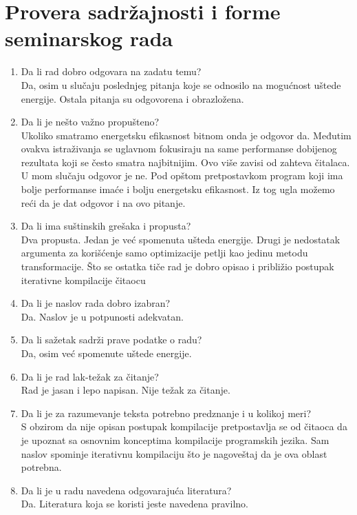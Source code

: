 \documentclass[a4paper]{report}
\begin{document}
\section{Provera sadržajnosti i forme seminarskog rada}

\begin{enumerate}
\item Da li rad dobro odgovara na zadatu temu?\\
Da, osim u slučaju poslednjeg pitanja koje se odnosilo na mogućnost uštede energije. Ostala pitanja su odgovorena i obrazložena.
\item Da li je nešto važno propušteno?\\
Ukoliko smatramo energetsku efikasnost bitnom onda je odgovor da. Međutim ovakva istraživanja se uglavnom fokusiraju na same performanse dobijenog rezultata koji se često smatra najbitnijim. Ovo više zavisi od zahteva čitalaca. U mom slučaju odgovor je ne. Pod opštom pretpostavkom program koji ima bolje performanse imaće i bolju energetsku efikasnost. Iz tog ugla možemo reći da je dat odgovor i na ovo pitanje.
\item Da li ima suštinskih grešaka i propusta?\\
Dva propusta. Jedan je već spomenuta ušteda energije. Drugi je nedostatak argumenta za korišćenje samo optimizacije petlji kao jedinu metodu transformacije. Što se ostatka tiče rad je dobro opisao i približio postupak iterativne kompilacije čitaocu
\item Da li je naslov rada dobro izabran?\\
Da. Naslov je u potpunosti adekvatan.
\item Da li sažetak sadrži prave podatke o radu?\\
Da, osim već spomenute uštede energije.
\item Da li je rad lak-težak za čitanje?\\
Rad je jasan i lepo napisan. Nije težak za čitanje.
\item Da li je za razumevanje teksta potrebno predznanje i u kolikoj meri?\\
S obzirom da nije opisan postupak kompilacije pretpostavlja se od čitaoca da je upoznat sa osnovnim konceptima kompilacije programskih jezika. Sam naslov spominje iterativnu kompilaciju što je nagoveštaj da je ova oblast potrebna. 
\item Da li je u radu navedena odgovarajuća literatura?\\
Da. Literatura koja se koristi jeste navedena pravilno.

\end{enumerate}
\end{document}
